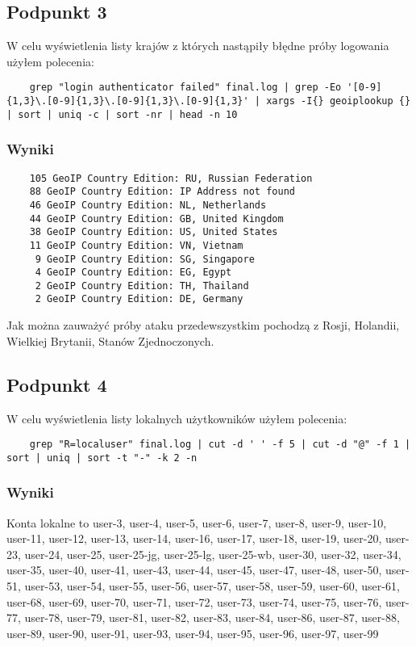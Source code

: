 \documentclass{article}
\begin{document}
\subsection{Podpunkt 3}
W celu wyświetlenia listy krajów z których nastąpiły błędne próby logowania użyłem polecenia:
\begin{verbatim}
    grep "login authenticator failed" final.log | grep -Eo '[0-9]{1,3}\.[0-9]{1,3}\.[0-9]{1,3}\.[0-9]{1,3}' | xargs -I{} geoiplookup {} | sort | uniq -c | sort -nr | head -n 10
\end{verbatim}
\subsubsection{Wyniki}
\begin{verbatim}
    105 GeoIP Country Edition: RU, Russian Federation
    88 GeoIP Country Edition: IP Address not found
    46 GeoIP Country Edition: NL, Netherlands
    44 GeoIP Country Edition: GB, United Kingdom
    38 GeoIP Country Edition: US, United States
    11 GeoIP Country Edition: VN, Vietnam
     9 GeoIP Country Edition: SG, Singapore
     4 GeoIP Country Edition: EG, Egypt
     2 GeoIP Country Edition: TH, Thailand
     2 GeoIP Country Edition: DE, Germany
\end{verbatim}
Jak można zauważyć próby ataku przedewszystkim pochodzą z Rosji, Holandii, Wielkiej Brytanii, Stanów Zjednoczonych.
\subsection{Podpunkt 4}
W celu wyświetlenia listy lokalnych użytkowników użyłem polecenia:
\begin{verbatim}
    grep "R=localuser" final.log | cut -d ' ' -f 5 | cut -d "@" -f 1 | sort | uniq | sort -t "-" -k 2 -n
\end{verbatim}
\subsubsection{Wyniki}
Konta lokalne to user-3, user-4, user-5, user-6, user-7, user-8, user-9, user-10, user-11, user-12, user-13, user-14, user-16, user-17, user-18, user-19, user-20, user-23, user-24, user-25, user-25-jg, user-25-lg, user-25-wb, user-30, user-32, user-34, user-35, user-40, user-41, user-43, user-44, user-45, user-47, user-48, user-50, user-51, user-53, user-54, user-55, user-56, user-57, user-58, user-59, user-60, user-61, user-68, user-69, user-70, user-71, user-72, user-73, user-74, user-75, user-76, user-77, user-78, user-79, user-81, user-82, user-83, user-84, user-86, user-87, user-88, user-89, user-90, user-91, user-93, user-94, user-95, user-96, user-97, user-99
\end{document}

